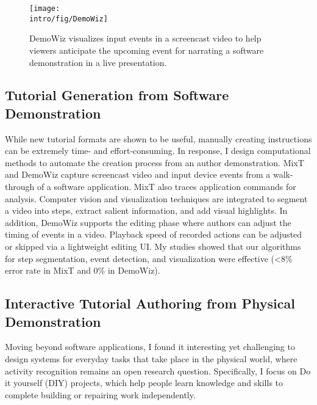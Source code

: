 \begin{figure*}[t]
\centering
\texttt{[image: \\intro/fig/DemoWiz]}
\caption{DemoWiz visualizes input events in a screencast video to help viewers anticipate the upcoming event for narrating a software demonstration in a live presentation.}
\label{fig:demowiz_intro}
\end{figure*}

\subsection{Tutorial Generation from Software Demonstration}

While new tutorial formats are shown to be useful, manually creating instructions can be extremely time- and effort-consuming. In response, I design computational methods to automate the creation process from an author demonstration. MixT and DemoWiz capture screencast video and input device events from a walk-through of a software application. MixT also traces application commands for analysis. Computer vision and visualization techniques are integrated to segment a video into steps, extract salient information, and add visual highlights.
%
In addition, DemoWiz supports the editing phase where authors can adjust the timing of events in a video. Playback speed of recorded actions can be adjusted or skipped via a lightweight editing UI. My studies showed that our algorithms for step segmentation, event detection, and visualization were effective (\textless8\% error rate in MixT and 0\% in DemoWiz).

\subsection{Interactive Tutorial Authoring from Physical Demonstration}


Moving beyond software applications, I found it interesting yet challenging to design systems for everyday tasks that take place in the physical world, where activity recognition remains an open research question.
%
Specifically, I focus on Do it yourself (DIY) projects, which help people learn knowledge and skills to complete building or repairing work independently.

